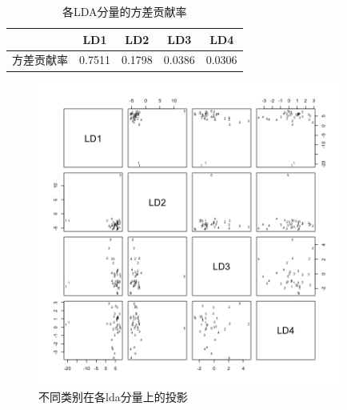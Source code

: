 \documentclass [a4paper]{article}
\begin{document}
\begin{table}[h]
  \centering
  \caption{各LDA分量的方差贡献率}
  \small %
  \begin{tabular}{ccccc}
  \toprule
  &LD1&LD2&LD3&LD4\\
  \midrule
  方差贡献率 & 0.7511 & 0.1798 &  0.0386 & 0.0306\\
  \bottomrule
  \end{tabular}
\end{table}
\begin{figure}[h!]
  \centering
         \includegraphics[width=10cm]{img/lda.png}
      \caption{不同类别在各lda分量上的投影}
\end{figure}
\end{document}
